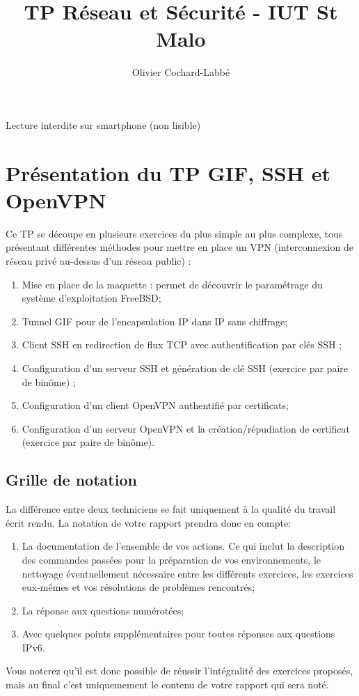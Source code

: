 \documentclass[a4paper,11pt]{article}
\author{Olivier Cochard-Labbé}
\title{TP Réseau et Sécurité - IUT St Malo}
\begin{document}
\maketitle
\centerline{
{\Large
{\selectfont{}\relax}
Lecture interdite sur smartphone (non lisible)
}
}
\tableofcontents
\clearpage
\sloppy
\section{Présentation du TP GIF, SSH et OpenVPN}
Ce TP se découpe en plusieurs exercices du plus simple au plus complexe, tous présentant différentes méthodes pour mettre en place un VPN (interconnexion de réseau privé au-dessus d'un réseau public) :
\begin{enumerate}
\item  Mise en place de la maquette : permet de découvrir le paramétrage du système d'exploitation FreeBSD;
\item Tunnel GIF pour de l'encapsulation IP dans IP sans chiffrage;
\item Client SSH en redirection de flux TCP avec authentification par clés SSH ;
\item Configuration d'un serveur SSH et génération de clé SSH (exercice par paire de binôme) ;
\item Configuration d'un client OpenVPN authentifié par certificats;
\item Configuration d'un serveur OpenVPN et la création/répudiation de certificat (exercice par paire de binôme).
\end{enumerate}
\subsection{Grille de notation}
La différence entre deux techniciens se fait uniquement à la qualité du travail écrit rendu. La notation de votre rapport prendra donc en compte:
\begin{enumerate}
\item La documentation de l'ensemble de vos actions. Ce qui inclut la description des commandes passées pour la préparation de vos environnements, le nettoyage éventuellement nécessaire entre les différents exercices, les exercices eux-mêmes et vos résolutions de problèmes rencontrés;
\item La réponse aux questions numérotées;
\item Avec quelques points supplémentaires pour toutes réponses aux questions IPv6.
\end{enumerate}
Vous noterez qu'il est donc possible de réussir l'intégralité des exercices proposés, mais au final c'est uniquemement le contenu de votre rapport qui sera noté.
\end{document}

